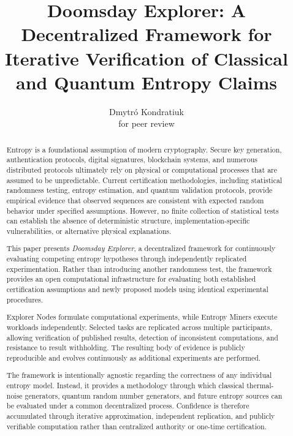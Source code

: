 \documentclass[11pt]{article}
\title{
Doomsday Explorer:
A Decentralized Framework for Iterative Verification of
Classical and Quantum Entropy Claims
}
\author{
Dmytr\'{o} Kondratiuk\\
for peer review
}
\begin{document}
\maketitle


\begin{abstract}

Entropy is a foundational assumption of modern cryptography.
Secure key generation, authentication protocols,
digital signatures, blockchain systems,
and numerous distributed protocols ultimately rely on
physical or computational processes that are assumed to be
unpredictable.
Current certification methodologies,
including statistical randomness testing,
entropy estimation,
and quantum validation protocols,
provide empirical evidence that observed sequences are
consistent with expected random behavior under specified assumptions.
However,
no finite collection of statistical tests can establish the
absence of deterministic structure,
implementation-specific vulnerabilities,
or alternative physical explanations.

This paper presents
\emph{Doomsday Explorer},
a decentralized framework for continuously evaluating
competing entropy hypotheses through independently replicated
experimentation.
Rather than introducing another randomness test,
the framework provides an open computational infrastructure
for evaluating both established certification assumptions
and newly proposed models using identical experimental procedures.

Explorer Nodes formulate computational experiments,
while Entropy Miners execute workloads independently.
Selected tasks are replicated across multiple participants,
allowing verification of published results,
detection of inconsistent computations,
and resistance to result withholding.
The resulting body of evidence is publicly reproducible
and evolves continuously as additional experiments are performed.

The framework is intentionally agnostic regarding the correctness
of any individual entropy model.
Instead,
it provides a methodology through which
classical thermal-noise generators,
quantum random number generators,
and future entropy sources
can be evaluated under a common decentralized process.
Confidence is therefore accumulated through
iterative approximation,
independent replication,
and publicly verifiable computation
rather than centralized authority or one-time certification.

\end{abstract}
\end{document}
